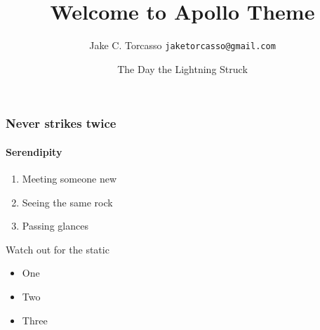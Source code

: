 \documentclass{beamer}
\title{Welcome to Apollo Theme}
\date[ISPN '80]{The Day the Lightning Struck}
\author[JT]{Jake C. Torcasso \texttt{jaketorcasso@gmail.com}}
\begin{document}
    \begin{frame}
        \titlepage
    \end{frame}

    \begin{frame}
        \frametitle{Never strikes twice}
        \framesubtitle{Serendipity}

        \begin{enumerate}
            \item Meeting someone new
            \item Seeing the same rock
            \item Passing glances
        \end{enumerate}
    \end{frame}

    \begin{frame}{Watch out for the static}
        \begin{itemize}
            \item One
            \item Two
            \item Three
        \end{itemize}
    \end{frame}
\end{document}
